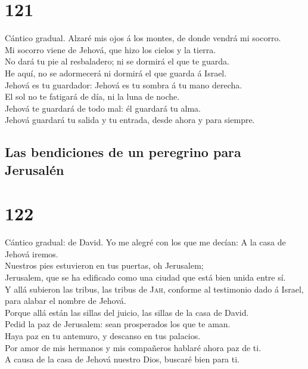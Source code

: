 \hypertarget{section-19-121}{%
\section{121}\label{section-19-121}}

 Cántico gradual. Alzaré mis ojos á los montes, de donde
vendrá mi socorro.\\
 Mi socorro viene de Jehová, que hizo los cielos y la
tierra.\\
 No dará tu pie al resbaladero; ni se dormirá el que te
guarda.\\
 He aquí, no se adormecerá ni dormirá el que guarda á
Israel.\\
 Jehová es tu guardador: Jehová es tu sombra á tu mano
derecha.\\
 El sol no te fatigará de día, ni la luna de noche.\\
 Jehová te guardará de todo mal: él guardará tu alma.\\
 Jehová guardará tu salida y tu entrada, desde ahora y
para siempre.

\hypertarget{las-bendiciones-de-un-peregrino-para-jerusaluxe9n}{%
\subsection{Las bendiciones de un peregrino para
Jerusalén}\label{las-bendiciones-de-un-peregrino-para-jerusaluxe9n}}

\hypertarget{section-19-122}{%
\section{122}\label{section-19-122}}

 Cántico gradual: de David. Yo me alegré con los que me
decían: A la casa de Jehová iremos.\\
 Nuestros pies estuvieron en tus puertas, oh Jerusalem;\\
 Jerusalem, que se ha edificado como una ciudad que está
bien unida entre sí.\\
 Y allá subieron las tribus, las tribus de \textsc{Jah},
conforme al testimonio dado á Israel, para alabar el nombre de Jehová.\\
 Porque allá están las sillas del juicio, las sillas de la
casa de David.\\
 Pedid la paz de Jerusalem: sean prosperados los que te
aman.\\
 Haya paz en tu antemuro, y descanso en tus palacios.\\
 Por amor de mis hermanos y mis compañeros hablaré ahora
paz de ti.\\
 A causa de la casa de Jehová nuestro Dios, buscaré bien
para ti.

